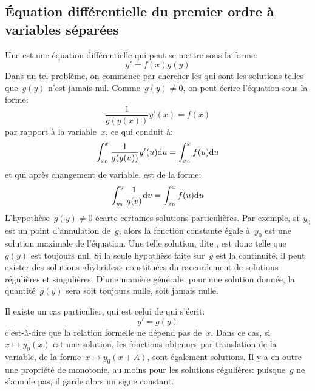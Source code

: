 \medskip
\subsection{Équation différentielle du premier ordre à variables séparées} 

Une  est une équation différentielle qui peut se mettre sous la forme:
\begin{equation}
y' = f(x)g(y)
\end{equation}
Dans un tel problème, on commence par chercher les  qui sont les solutions telles que~$g(y)$ n'est jamais nul. Comme~$g(y)\ne0$, on peut écrire l'équation sous la forme:
\begin{equation}
\frac{1}{g(y(x))} y'(x) = f(x)
\end{equation}
par rapport à la variable~$x$, ce qui conduit à:
\begin{equation}
\int_{x_0}^x \frac{1}{g(y(u))}y'(u) \text{d} u = \int_{x_0}^x f(u) \text{d} u 
\end{equation}
et qui après changement de variable, est de la forme:
\begin{equation}
\int_{y_0}^y \frac{1}{g(v)} \text{d} v = \int_{x_0}^x f(u) \text{d} u 
\end{equation}
L'hypothèse~$g(y)\ne0$ écarte certaines solutions particulières. Par exemple, si~$y_0$ est un point d'annulation de~$g$, alors la fonction constante égale à~$y_0$ est une solution maximale de l'équation. Une telle solution, dite , est donc telle que~$g(y)$ est toujours nul. Si la seule hypothèse faite sur~$g$ est la continuité, il peut exister des solutions «hybrides» constituées du raccordement de solutions régulières et singulières. D'une manière générale, pour une solution donnée, la quantité~$g(y)$ sera soit toujours nulle, soit jamais nulle. 

Il existe un cas particulier, qui est celui de  qui s'écrit:
\begin{equation}
y' = g(y)
\end{equation}
c'est-à-dire que la relation formelle ne dépend pas de~$x$. Dans ce cas, si~$x \mapsto y_0(x)$ est une solution, les fonctions obtenues par translation de la variable, de la forme~$x \mapsto y_0(x+A)$, sont également solutions. Il y a en outre une propriété de monotonie, au moins pour les solutions régulières: puisque~$g$ ne s'annule pas, il garde alors un signe constant. 
 
